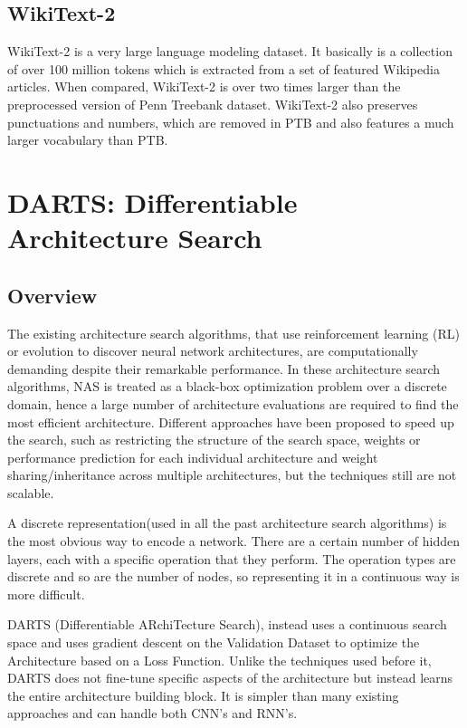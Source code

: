 \documentclass{ieee}
\begin{document}
\subsection{WikiText-2}
WikiText-2 is a very large language modeling dataset. It basically is a collection of over 100 million tokens which is extracted from a set of featured Wikipedia articles. When compared, WikiText-2 is over two times larger than the preprocessed version of Penn Treebank dataset. WikiText-2 also preserves punctuations and numbers, which are removed in PTB and also features a much larger vocabulary than PTB.

\section{DARTS: Differentiable Architecture Search}
\subsection{Overview}
The existing architecture search algorithms, that use reinforcement learning (RL) or evolution to discover neural network architectures, are computationally demanding despite their remarkable performance. In these architecture search algorithms, NAS is treated as a black-box optimization problem over a discrete domain, hence a large number of architecture evaluations are required to find the most efficient architecture. Different approaches have been proposed to speed up the search, such as restricting the structure of the search space, weights or performance prediction for each individual architecture and weight sharing/inheritance across multiple architectures, but the techniques still are not scalable. 

 A discrete representation(used in all the past architecture search algorithms) is the most obvious way to encode a network. There are a certain number of hidden layers, each with a specific operation that they perform. The operation types are discrete and so are the number of nodes, so representing it in a continuous way is more difficult. 

DARTS (Differentiable ARchiTecture Search), instead uses a continuous search space and uses gradient descent on the Validation Dataset to optimize the Architecture based on a Loss Function. Unlike the techniques used before it, DARTS does not fine-tune specific aspects of the architecture but instead learns the entire architecture building block.  It is simpler than many existing approaches and can handle both CNN's and RNN's.
\end{document}
